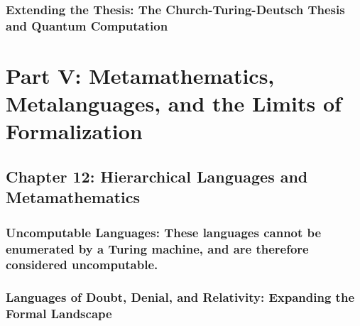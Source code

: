 \hypertarget{extending-the-thesis-the-church-turing-deutsch-thesis-and-quantum-computation}{%
\subsubsection*{Extending the Thesis: The Church-Turing-Deutsch Thesis
and Quantum
Computation}\label{extending-the-thesis-the-church-turing-deutsch-thesis-and-quantum-computation}}

\hypertarget{part-v-metamathematics-metalanguages-and-the-limits-of-formalization}{%
\section*{Part V: Metamathematics, Metalanguages, and the Limits of
Formalization}\label{part-v-metamathematics-metalanguages-and-the-limits-of-formalization}}

\hypertarget{chapter-12-hierarchical-languages-and-metamathematics}{%
\subsection*{Chapter 12: Hierarchical Languages and
Metamathematics}\label{chapter-12-hierarchical-languages-and-metamathematics}}

\hypertarget{uncomputable-languages-these-languages-cannot-be-enumerated-by-a-turing-machine-and-are-therefore-considered-uncomputable.}{%
\subsubsection*{Uncomputable Languages: These languages cannot be
enumerated by a Turing machine, and are therefore considered
uncomputable.}\label{uncomputable-languages-these-languages-cannot-be-enumerated-by-a-turing-machine-and-are-therefore-considered-uncomputable.}}

\hypertarget{languages-of-doubt-denial-and-relativity-expanding-the-formal-landscape}{%
\subsubsection*{Languages of Doubt, Denial, and Relativity: Expanding
the Formal
Landscape}\label{languages-of-doubt-denial-and-relativity-expanding-the-formal-landscape}}

